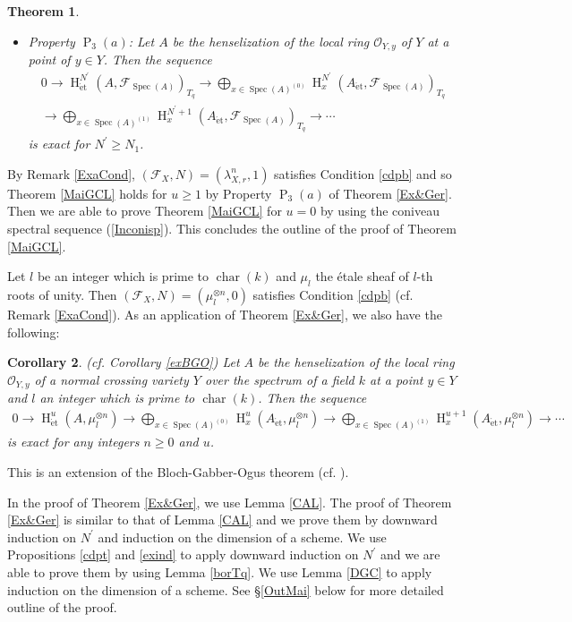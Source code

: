 \documentclass{article}
\newtheorem{thm}{\indent \sc Theorem}[section]
\newtheorem{cor}[thm]{\indent \sc Corollary}
\newcommand{\spec}{\operatorname{Spec}}
\newcommand{\et}{\mathrm{\acute{e}t}}
\newcommand{\HO}{\operatorname{H}}
\begin{document}
\begin{thm}
\begin{itemize}
%
\item Property $\operatorname{P}_{3}(a)$: Let $A$ be the henselization of the local ring
$\mathcal{O}_{Y, y}$ of $Y$ at a point of $y\in Y$. Then
the sequence
%
\begin{align*}
0\to \HO^{N^{\prime}}_{\et}(A, \mathcal{F}_{\spec(A)})_{T_{q}}
\to
\bigoplus_{x\in \spec(A)^{(0)}}
\HO^{N^{\prime}}_{x}(A_{\et}, 
\mathcal{F}_{\spec(A)})_{T_{q}}
\\
\to
\bigoplus_{x\in \spec(A)^{(1)}}
\HO^{N^{\prime}+1}_{x}(A_{\et}, 
\mathcal{F}_{\spec(A)})_{T_{q}} 
\to
\cdots
\end{align*}
%
is exact for $N^{\prime}\geq N_{1}$.
%
\end{itemize}
%
%
\end{thm}
%

By Remark \ref{ExaCond}, $(\mathcal{F}_{X}, N)=(\lambda^{n}_{X, r}, 1)$
satisfies Condition \ref{cdpb}
and so Theorem \ref{MaiGCL} holds for $u\geq 1$ by Property $\operatorname{P}_{3}(a)$
of Theorem \ref{Ex&Ger}.
Then we are able to prove Theorem \ref{MaiGCL} for $u=0$
by using the coniveau spectral sequence (\ref{Inconisp}). 
This concludes the outline of the proof of Theorem \ref{MaiGCL}.

Let $l$ be an integer which is prime to
$\operatorname{char}(k)$ and
$\mu_{l}$ the \'{e}tale sheaf of $l$-th roots of unity.
Then $(\mathcal{F}_{X}, N)=(\mu_{l}^{\otimes n}, 0)$
satisfies Condition \ref{cdpb} (cf. Remark \ref{ExaCond}). As an application of Theorem \ref{Ex&Ger},
we also have the following:

%
\begin{cor}\upshape(cf. Corollary \ref{exBGO}) 
Let $A$ be the henselization of the local ring
$\mathcal{O}_{Y, y}$ of a normal crossing variety $Y$ 
over the spectrum of a field $k$
at a point $y\in Y$
and
$l$ an integer which is prime to
$\operatorname{char}(k)$. 
Then the sequence
%
\begin{align*}
0\to \HO^{u}_{\et}(A, \mu^{\otimes n}_{l})
\to
\bigoplus_{x\in \spec(A)^{(0)}}
\HO^{u}_{x}(A_{\et}, \mu_{l}^{\otimes n})
\to
\bigoplus_{x\in \spec(A)^{(1)}}
\HO^{u+1}_{x}(A_{\et}, \mu_{l}^{\otimes n}) 
\to
\cdots
\end{align*}
%
is exact for any integers $n\geq 0$ and $u$.    
\end{cor}
%

This is an extension of the Bloch-Gabber-Ogus theorem (cf. \cite[Corollary 2.2.2]{C-H-K}).



In the proof of Theorem \ref{Ex&Ger}, 
we use Lemma \ref{CAL}.
The proof of Theorem \ref{Ex&Ger} is similar to 
that of Lemma \ref{CAL}
and we prove them by 
downward
induction on $N^{\prime}$
and induction on the dimension of a scheme.
We use Propositions \ref{cdpt} and \ref{exind}
to apply downward induction on $N^{\prime}$ and
we are able to prove them
by 
using Lemma \ref{borTq}.
We use Lemma \ref{DGC} to apply induction on the dimension 
of a scheme.
See \S \ref{OutMai} below for more detailed outline of the proof.
\end{document}
